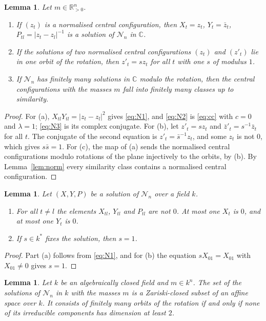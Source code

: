 \documentclass[11pt]{amsart}
\newtheorem{lemma}[theorem]{Lemma}
\theoremstyle{definition}
\theoremstyle{remark}
\numberwithin{equation}{section}
\newcommand{\CC}{\mathbb{C}}
\newcommand{\RR}{\mathbb{R}}
\newcommand{\cN}{\mathcal{N}}
\begin{document}
\begin{lemma}\label{lem:cc-sol}
Let $m \in \RR_{>0}^n$.
\begin{enumerate}
\item[(a)] If $(z_t)$ is a normalised central configuration, then $X_t = z_t$, $Y_t = \bar z_t$,
$P_{tl} = |z_t - z_l|^{-1}$ is a solution of $\cN_n$ in $\CC$.
\item[(b)] If the solutions of two normalised central configurations $(z_t)$ and $(z'_t)$ lie in one orbit
of the rotation, then $z'_t = s z_t$ for all $t$ with one $s$ of modulus $1$.
\item[(c)] If $\cN_n$ has finitely many solutions in $\CC$ modulo the rotation, then the central
configurations with the masses $m$ fall into finitely many classes up to similarity.
\end{enumerate}
\end{lemma}

\begin{proof}
For (a), $X_{tl} Y_{tl} = |z_t - z_l|^2$ gives \eqref{eq:N1}, and \eqref{eq:N2} is \eqref{eq:cc} with
$c = 0$ and $\lambda = 1$; \eqref{eq:N3} is its complex conjugate. For (b), let $z'_t = s z_t$ and
$\bar z'_t = s^{-1} \bar z_t$ for all $t$. The conjugate of the second equation is
$z'_t = \bar s^{-1} z_t$, and some $z_t$ is not $0$, which gives $s \bar s = 1$. For (c), the map of (a)
sends the normalised central configurations modulo rotations of the plane injectively to the orbits, by
(b). By Lemma~\ref{lem:norm} every similarity class contains a normalised central configuration.
\end{proof}

\begin{lemma}\label{lem:facts}
Let $(X, Y, P)$ be a solution of $\cN_n$ over a field $k$.
\begin{enumerate}
\item[(a)] For all $t \ne l$ the elements $X_{tl}$, $Y_{tl}$ and $P_{tl}$ are not $0$. At most one $X_t$
is $0$, and at most one $Y_t$ is $0$.
\item[(b)] If $s \in k^{*}$ fixes the solution, then $s = 1$.
\end{enumerate}
\end{lemma}

\begin{proof}
Part (a) follows from \eqref{eq:N1}, and for (b) the equation $s X_{01} = X_{01}$ with $X_{01} \ne 0$
gives $s = 1$.
\end{proof}

\begin{lemma}\label{lem:orbits}
Let $k$ be an algebraically closed field and $m \in k^n$. The set of the solutions of $\cN_n$ in $k$ with
the masses $m$ is a Zariski-closed subset of an affine space over $k$. It consists of finitely many orbits
of the rotation if and only if none of its irreducible components has dimension at least $2$.
\end{lemma}
\end{document}
